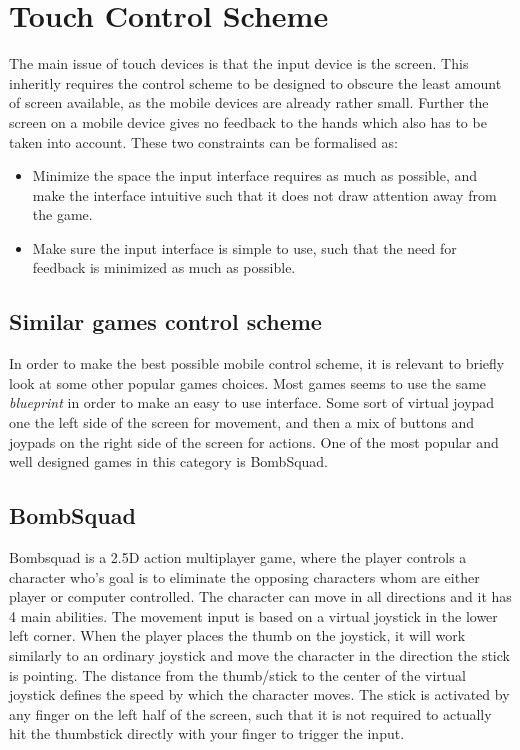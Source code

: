 \section{Touch Control Scheme}
The main issue of touch devices is that the input device is the screen.
This inheritly requires the control scheme to be designed to obscure the least amount of screen available, as the mobile devices are already rather small.
Further the screen on a mobile device gives no feedback to the hands which also has to be taken into account.
These two constraints can be formalised as:
\begin{itemize}
\item Minimize the space the input interface requires as much as possible, and make the interface intuitive such that it does not draw attention away from the game.
\item Make sure the input interface is simple to use, such that the need for feedback is minimized as much as possible.
\end{itemize}

\subsection{Similar games control scheme}
In order to make the best possible mobile control scheme, it is relevant to briefly look at some other popular games choices.
Most games seems to use the same \emph{blueprint} in order to make an easy to use interface. Some sort of virtual joypad one the left side of the screen for movement, and then a mix of buttons and joypads on the right side of the screen for actions. 
One of the most popular and well designed games in this category is BombSquad.

\subsection*{BombSquad}\label{sec:modules:controlscheme:bombsquad}
Bombsquad\cite{bombsquad} is a 2.5D action multiplayer game, where the player controls a character who's goal is to eliminate the opposing characters whom are either player or computer controlled.
The character can move in all directions and it has 4 main abilities. 
The movement input is based on a virtual joystick in the lower left corner.
When the player places the thumb on the joystick, it will work similarly to an ordinary joystick and move the character in the direction the stick is pointing. 
The distance from the thumb/stick to the center of the virtual joystick defines the speed by which the character moves. 
The stick is activated by any finger on the left half of the screen, such that it is not required to actually hit the thumbstick directly with your finger to trigger the input.


